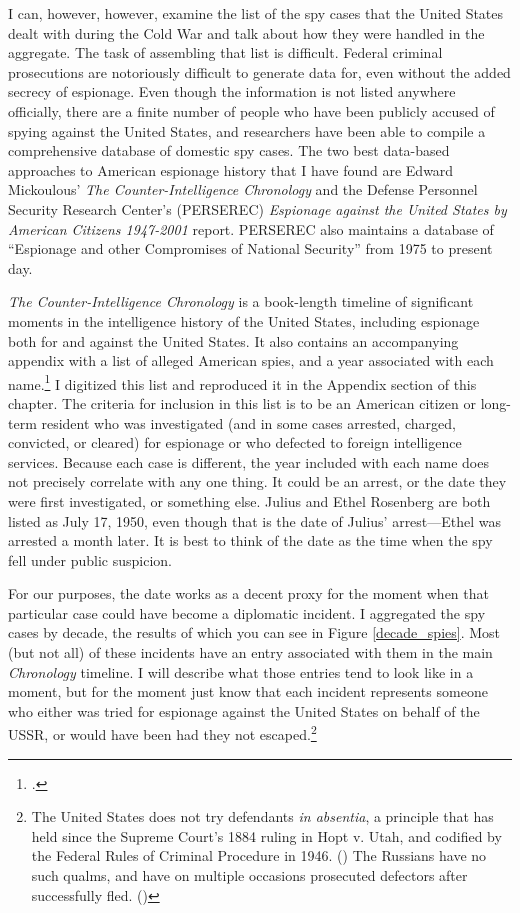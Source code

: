 \documentclass{memoir}
\begin{document}
\begin{refsegment}
I can, however, however, examine the list of the spy cases that the United States dealt with during the Cold War and talk about how they were handled in the aggregate. The task of assembling that list is difficult. Federal criminal prosecutions are notoriously difficult to generate data for, even without the added secrecy of espionage. Even though the information is not listed anywhere officially, there are a finite number of people who have been publicly accused of spying against the United States, and researchers have been able to compile a comprehensive database of domestic spy cases. The two best data-based approaches to American espionage history that I have found are Edward Mickoulous' \emph{The Counter-Intelligence Chronology} and the Defense Personnel Security Research Center's (PERSEREC) \emph{Espionage against the United States by American Citizens 1947-2001} report. PERSEREC also maintains a database of ``Espionage and other Compromises of National Security'' from 1975 to present day.

\emph{The Counter-Intelligence Chronology} is a book-length timeline of significant moments in the intelligence history of the United States, including espionage both for and against the United States. It also contains an accompanying appendix with a list of alleged American spies, and a year associated with each name.\footcite[p.~173]{mickolus_counterintelligence_2015} I digitized this list and reproduced it in the Appendix section of this chapter. The criteria for inclusion in this list is to be an American citizen or long-term resident who was investigated (and in some cases arrested, charged, convicted, or cleared) for espionage or who defected to foreign intelligence services. Because each case is different, the year included with each name does not precisely correlate with any one thing. It could be an arrest, or the date they were first investigated, or something else. Julius and Ethel Rosenberg are both listed as July 17, 1950, even though that is the date of Julius' arrest---Ethel was arrested a month later. It is best to think of the date as the time when the spy fell under public suspicion.

For our purposes, the date works as a decent proxy for the moment when that particular case could have become a diplomatic incident. I aggregated the spy cases by decade, the results of which you can see in Figure \ref{decade_spies}. Most (but not all) of these incidents have an entry associated with them in the main \emph{Chronology} timeline. I will describe what those entries tend to look like in a moment, but for the moment just know that each incident represents someone who either was tried for espionage against the United States on behalf of the USSR, or would have been had they not escaped.\footnote{The United States does not try defendants \emph{in absentia}, a principle that has held since the Supreme Court's 1884 ruling in Hopt v. Utah, and codified by the Federal Rules of Criminal Procedure in 1946. (\cite{noauthor_rule_1946-1}) The Russians have no such qualms, and have on multiple occasions prosecuted defectors after successfully fled. (\cite{traynor_trial_2002})}


\end{refsegment}
\end{document}
